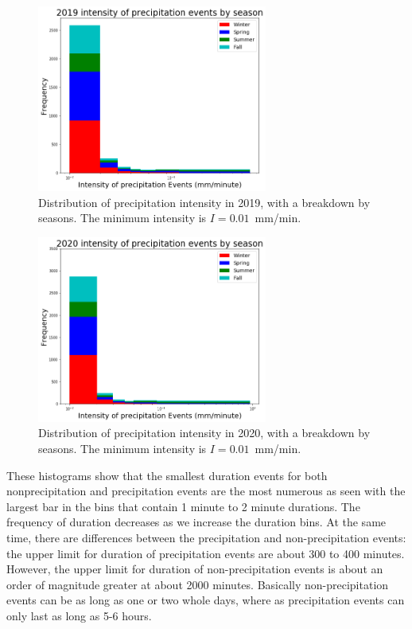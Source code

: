 \documentclass[11pt]{report}
\begin{document}
\begin{figure}[t]
  \centering
  \includegraphics[width=0.675\textwidth]{Figures/inten2019.png}
  \caption[Intensity histogram for 2019 broken down by season]
          {\label{i2019}Distribution of precipitation intensity in 2019,
            with a breakdown by seasons. The minimum intensity is
            $I=0.01$~mm/min.  }
\end{figure}
\begin{figure}[b]
  \centering
  \includegraphics[width=0.675\textwidth]{Figures/inten2020.png}
  \caption[Intensity histogram for 2020 broken down by season]
          {\label{i2020} Distribution of precipitation intensity in 2020,
            with a breakdown by seasons. The minimum intensity is
            $I=0.01$~mm/min.}
\end{figure}
\clearpage

These histograms show that the smallest duration events for both
nonprecipitation and precipitation events are the most numerous as seen with
the largest bar in the bins that contain 1 minute to 2 minute durations. The
frequency of duration decreases as we increase the duration bins. At the
same time, there are differences between the precipitation and
non-precipitation events: the upper limit for duration of precipitation
events are about 300 to 400 minutes. However, the upper limit for duration
of non-precipitation events is about an order of magnitude greater at about
2000 minutes. Basically non-precipitation events can be as long as one or
two whole days, where as precipitation events can only last as long as 5-6
hours.
\end{document}
